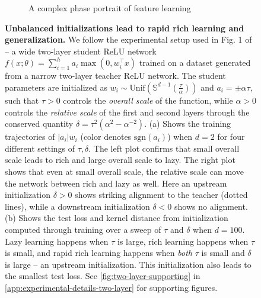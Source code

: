 \documentclass{article}
\theoremstyle{plain}
\theoremstyle{definition}
\theoremstyle{remark}
\begin{document}
\begin{figure}[t]
\begin{subfigure}[c]{0.53\textwidth}
        \caption{A complex phase portrait of feature learning}
    \end{subfigure}
    \caption{\textbf{Unbalanced initializations lead to rapid rich learning and generalization.}
    We follow the experimental setup used in Fig. 1 of \citet{chizat2019lazy} -- a wide two-layer student ReLU network $f(x;\theta) = \sum_{i=1}^h a_i \max(0,w_i^\intercal x)$ trained on a dataset generated from a narrow two-layer teacher ReLU network.
    The student parameters are initialized as $w_i \sim \text{Unif}(\mathbb{S}^{d-1}(\frac{\tau}{\alpha}))$ and $a_i = \pm\alpha\tau$, such that $\tau > 0$ controls the \emph{overall scale} of the function, while $\alpha > 0$ controls the \emph{relative scale} of the first and second layers through the conserved quantity $\delta = \tau^2 (\alpha^2 - \alpha^{-2})$.
    (a) Shows the training trajectories of $|a_i|w_i$ (color denotes $\mathrm{sgn}(a_i)$) when $d = 2$ for four different settings of $\tau, \delta$.
    The left plot confirms that small overall scale leads to rich and large overall scale to lazy.
    The right plot shows that even at small overall scale, the relative scale can move the network between rich and lazy as well.
    Here an upstream initialization $\delta > 0$ shows striking alignment to the teacher (dotted lines), while a downstream initialization $\delta < 0$ shows no alignment.
    (b) Shows the test loss and kernel distance from initialization computed through training over a sweep of $\tau$ and $\delta$ when $d=100$.
    Lazy learning happens when $\tau$ is large, rich learning happens when $\tau$ is small, and rapid rich learning happens when \emph{both} $\tau$ is small and $\delta$ is large -- an upstream initialization.
    This initialization also leads to the smallest test loss.
    See \cref{fig:two-layer-supporting} in \cref{app:experimental-details-two-layer} for supporting figures.
    }
    \label{fig:two-layer-relu}
    \vspace{-20pt}
\end{figure}
\end{document}

